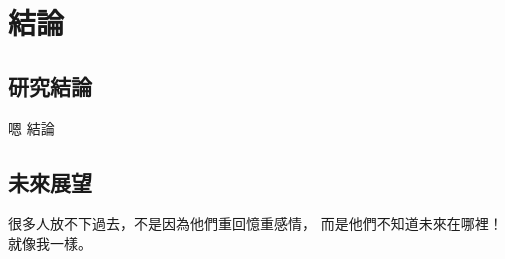 

\chapter{結論}\label{conclusion_and_future}

\section{研究結論}

嗯 結論

\section{未來展望}

很多人放不下過去，不是因為他們重回憶重感情，
而是他們不知道未來在哪裡！就像我一樣。
